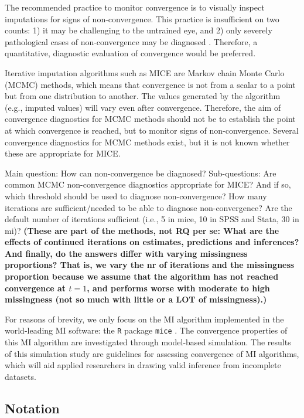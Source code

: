 \documentclass[Royal,times,sageh]{sagej}
\begin{document}
The recommended practice to monitor convergence is to visually inspect
imputations for signs of non-convergence. This practice is insufficient
on two counts: 1) it may be challenging to the untrained eye, and 2)
only severely pathological cases of non-convergence may be diagnosed
\citep[\(\S\) 6.5.2]{buur18}. Therefore, a quantitative, diagnostic
evaluation of convergence would be preferred.

Iterative imputation algorithms such as MICE are Markov chain Monte
Carlo (MCMC) methods, which means that convergence is not from a scalar
to a point but from one distribution to another. The values generated by
the algorithm (e.g., imputed values) will vary even after convergence.
Therefore, the aim of convergence diagnostics for MCMC methods should
not be to establish the point at which convergence is reached, but to
monitor signs of non-convergence. Several convergence diagnostics for
MCMC methods exist, but it is not known whether these are appropriate
for MICE.

Main question: How can non-convergence be diagnosed? Sub-questions: Are
common MCMC non-convergence diagnostics appropriate for MICE? And if so,
which threshold should be used to diagnose non-convergence? How many
iterations are sufficient/needed to be able to diagnose non-convergence?
Are the default number of iterations sufficient (i.e., 5 in mice, 10 in
SPSS and Stata, 30 in mi)? \textbf{(These are part of the methods, not
RQ per se: What are the effects of continued iterations on estimates,
predictions and inferences? And finally, do the answers differ with
varying missingness proportions? That is, we vary the nr of iterations
and the missingness proportion because we assume that the algorithm has
not reached convergence at \(t=1\), and performs worse with moderate to
high missingness (not so much with little or a LOT of missingness).)}

For reasons of brevity, we only focus on the MI algorithm implemented in
the world-leading MI software: the \texttt{R} \citep{R} package
\texttt{mice} \citep{mice}. The convergence properties of this MI
algorithm are investigated through model-based simulation. The results
of this simulation study are guidelines for assessing convergence of MI
algorithms, which will aid applied researchers in drawing valid
inference from incomplete datasets.

\hypertarget{notation}{%
\subsection{Notation}\label{notation}}
\end{document}
